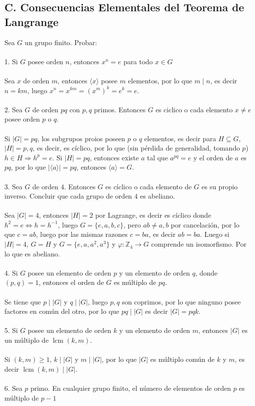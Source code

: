 \documentclass{article}
\newcommand{\Z}{\mathbb{Z}}
\begin{document}
\subsection*{C. Consecuencias Elementales del Teorema de Langrange}
Sea $G$ un grupo finito. Probar:
\\
\\
1. Si $G$ posee orden $n$, entonces $x^{n}=e$ para todo $x \in G$
\\
\\
Sea $x$ de orden $m$, entonces $\langle x \rangle$ posee $m$ elementos, por lo que $m \mid n$, es decir $n=km$, luego $x^{n}=x^{km}=(x^{m})^{k}=e^{k}=e$.
\\
\\
2.  Sea $G$ de orden $pq$ con $p,q$ primos. Entonces $G$ es ciclico o cada elemento $x \neq e$ posee orden $p$ o $q$.
\\
\\
Si $|G|=pq$, los subgrupos proios poseen $p$ o $q$ elementos, es decir para $H \subseteq G$, $|H|=p,q$, es decir, es cíclico, por lo que (sin pérdida de generalidad, tomando $p$) $h \in H \Longrightarrow h^{p}=e$. Si $|H|=pq$, entonces existe $a$ tal que $a^{pq}=e$ y el orden de $a$ es $pq$, por lo que $|\langle a \rangle|=pq$, entonces $\langle a \rangle=G$.
\\
\\
3. Sea $G$ de orden $4$. Entonces $G$ es cíclico o cada elemento de $G$ es su propio inverso. Concluir que cada grupo de orden $4$ es abeliano.
\\
\\
Sea $|G|=4$, entonces $|H|=2$ por Lagrange, es decir es cíclico donde $h^{2}=e \Longleftrightarrow h=h^{-1}$, luego $G=\{e,a,b,c\}$, pero $ab \neq a,b$ por cancelación, por lo que $c=ab$, luego por las mismas razones $c=ba$, es decir $ab=ba$. Luego si $|H|=4$, $G=H$ y $G=\{e,a,a^{2},a^{3} \}$ y $\varphi: \Z_{4} \to G$ comprende un isomorfismo. Por lo que es abeliano.
\\
\\
4. Si $G$ posee un elemento de orden $p$ y un elemento de orden $q$, donde $(p,q)=1$, entonces el orden de $G$ es múltiplo de $pq$.
\\
\\
Se tiene que $p\mid |G|$ y $q \mid |G|$, luego $p,q$ son coprimos, por lo que ninguno posee factores en común del otro, por lo que $pq \mid |G|$ es decir $|G|=pqk$.
\\
\\
5. Si $G$ posee un elemento de orden $k$ y un elemento de orden $m$, entonces $|G|$ es un múltiplo de $\operatorname{lcm}(k,m)$.
\\
\\
Si $(k,m) \geq 1$, $k \mid |G|$ y $m \mid |G|$, por lo que $|G|$ es múltiplo común de $k$ y $m$, es decir $\operatorname{lcm}(k,m) \mid |G|$.
\\
\\
6. Sea $p$ primo. En cualquier grupo finito, el número de elementos de orden $p$ es múltiplo de $p-1$
\end{document}
